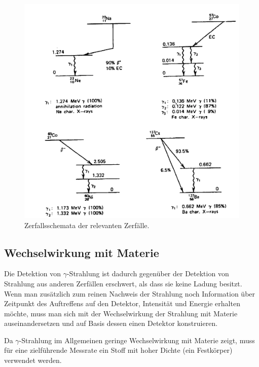\documentclass[
	a4paper,
	12pt,
	pagesize,
	ngerman
]{scrartcl}
\begin{document}
	\begin{figure}[H]
			\includegraphics[width= 1 \linewidth]{charts/Zerfallsschemata}
			\caption{
				Zerfallsschemata der relevanten Zerfälle. %
				\cite{Anleitung}
			}
			\label{fig_zerfallsschemata}
	\end{figure}

	\subsection{Wechselwirkung mit Materie}

	Die Detektion von $\gamma$-Strahlung ist dadurch gegenüber der Detektion von Strahlung aus anderen Zerfällen erschwert, als dass sie keine Ladung besitzt.
	Wenn man zusätzlich zum reinen Nachweis der Strahlung noch Information über Zeitpunkt des Auftreffens auf den Detektor, Intensität und Energie erhalten möchte, muss man sich mit der Wechselwirkung der Strahlung mit Materie auseinandersetzen und auf Basis dessen einen Detektor konstruieren.

	Da $\gamma$-Strahlung im Allgemeinen geringe Wechselwirkung mit Materie zeigt, muss für eine zielführende Messrate ein Stoff mit hoher Dichte (ein Festkörper) verwendet werden.
\end{document}
